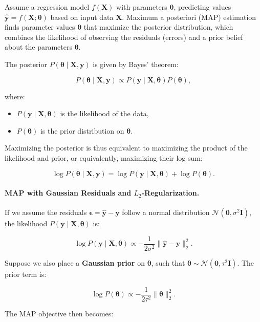     Assume a regression model \( f(\bm{X}) \) with parameters \( \bm{\theta} \), predicting values \( \hat{\bm{y}} = f(\bm{X}; \bm{\theta}) \) based on input data \( \bm{X} \). Maximum a posteriori (MAP) estimation finds parameter values \( \bm{\theta} \) that maximize the posterior distribution, which combines the likelihood of observing the residuals (errors) and a prior belief about the parameters \( \bm{\theta} \).
    
    The posterior \( P(\bm{\theta} \mid \bm{X}, \bm{y}) \) is given by Bayes’ theorem:
    
    \[
    P(\bm{\theta} \mid \bm{X}, \bm{y}) \propto P(\bm{y} \mid \bm{X}, \bm{\theta}) P(\bm{\theta}),
    \]
    
    where:
    \begin{itemize}
        \item \( P(\bm{y} \mid \bm{X}, \bm{\theta}) \) is the likelihood of the data,
        \item \( P(\bm{\theta}) \) is the prior distribution on \( \bm{\theta} \).
    \end{itemize}
    
    Maximizing the posterior is thus equivalent to maximizing the product of the likelihood and prior, or equivalently, maximizing their log sum:
    
    \[
    \log P(\bm{\theta} \mid \bm{X}, \bm{y}) = \log P(\bm{y} \mid \bm{X}, \bm{\theta}) + \log P(\bm{\theta}).
    \]
    
    \paragraph{MAP with Gaussian Residuals and \( L_2 \)-Regularization.}
    
    If we assume the residuals \( \bm{\epsilon} = \hat{\bm{y}} - \bm{y} \) follow a normal distribution \( \mathcal{N}(\bm{0}, \sigma^2 \bm{I}) \), the likelihood \( P(\bm{y} \mid \bm{X}, \bm{\theta}) \) is:
    
    \[
    \log P(\bm{y} \mid \bm{X}, \bm{\theta}) \propto -\frac{1}{2\sigma^2} \|\hat{\bm{y}} - \bm{y}\|_2^2.
    \]
    
    Suppose we also place a \textbf{Gaussian prior} on \( \bm{\theta} \), such that \( \bm{\theta} \sim \mathcal{N}(\bm{0}, \tau^2 \bm{I}) \). The prior term is:
    
    \[
    \log P(\bm{\theta}) \propto -\frac{1}{2\tau^2} \|\bm{\theta}\|_2^2.
    \]
    
    The MAP objective then becomes:
    
